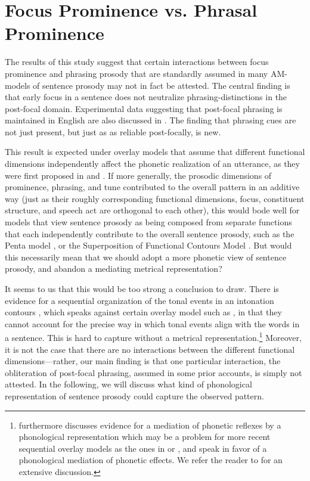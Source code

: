 \documentclass[preprint,review,12pt,authoryear,times]{elsarticle}
\begin{document}
\section{Focus Prominence vs. Phrasal Prominence}

The results of this study suggest that certain interactions between focus prominence and phrasing prosody that are standardly assumed in many AM-models of sentence prosody may not in fact be attested. The central finding is that early focus in a sentence does not neutralize phrasing-distinctions in the post-focal domain. Experimental data suggesting that post-focal phrasing is maintained in English are also discussed in \citet{norcl05} \citep[and][for other languages]{jun00, sugah03, ishih03, ishih16, kugle17}.  The finding that phrasing cues are not just present, but just as as reliable post-focally, is new.  

This result is expected under overlay models that assume that different functional dimensions independently affect the phonetic realization of an utterance, as they were first proposed in \citet{ohman67} and  \citet{fujis81}. If more generally, the prosodic dimensions of prominence, phrasing, and tune contributed to the overall pattern in an additive way (just as their roughly corresponding functional dimensions, focus, constituent structure, and speech act are orthogonal to each other),  this would bode well for models that view sentence prosody as being composed from separate functions that each independently contribute to the overall sentence prosody, such as the Penta model  \citep{xu05}, or the Superposition of Functional Contours Model \citep{baill05,geraz18}. But would this necessarily mean that we should adopt a more phonetic view of sentence prosody, and abandon a mediating metrical representation? 

It seems to us that this would be too strong a conclusion to draw. There is evidence for a sequential organization of the tonal events in an intonation contours \citep{ladd08}, which speaks against certain overlay model such as  \citet{fujis81}, in that they cannot account for the precise way in which tonal events align with the words in a sentence. This is hard to capture without a metrical representation.\footnote{\citet{ladd08} furthermore discusses evidence for a  mediation of phonetic reflexes by a phonological representation which may be a problem for more recent sequential overlay models as the ones in \citet{mobiu93} or \citet{xu05}, and speak in favor of a phonological mediation of phonetic effects.  We refer the reader to \citet{ladd08} for an extensive discussion.} Moreover, it is not the case that there are no interactions between the different functional dimensions---rather, our main finding is that one particular interaction, the obliteration of post-focal phrasing, assumed in some prior accounts, is simply not attested. In the following, we will discuss what kind of phonological representation of sentence prosody could capture the observed pattern. 
\end{document}
